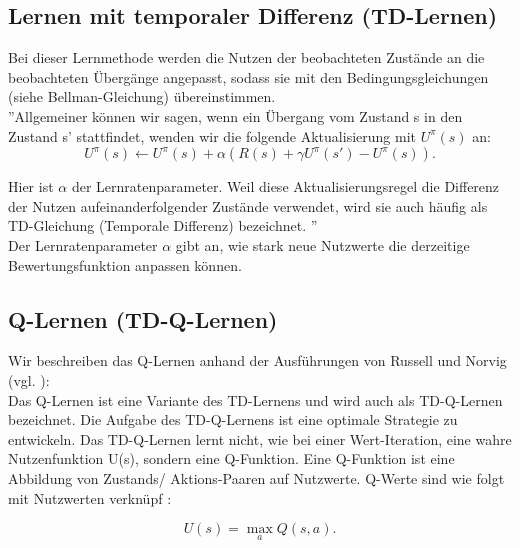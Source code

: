 \subsection{Lernen mit temporaler Differenz (TD-Lernen)}
\label{subsec:Lernen mit temporaler Differenz}
Bei dieser Lernmethode werden die Nutzen der beobachteten Zustände an die beobachteten Übergänge angepasst, sodass sie mit den Bedingungsgleichungen (siehe Bellman-Gleichung) übereinstimmen. \\

''Allgemeiner können wir sagen, wenn ein Übergang vom Zustand s in den Zustand s' stattfindet, wenden wir die folgende Aktualisierung mit $U^\pi(s)$ an:\\
\begin{equation}
\label{eq:Aktualisierungsgleichung temporale Differenz}
U^\pi(s) \leftarrow U^\pi(s) + \alpha(R(s) + \gamma U^\pi(s') - U^\pi(s)).
\end{equation}

Hier ist $\alpha$ der Lernratenparameter. Weil diese Aktualisierungsregel die Differenz der Nutzen aufeinanderfolgender Zustände verwendet, wird sie auch häufig als TD-Gleichung (Temporale Differenz) bezeichnet. \cite[966\psq]{Russell}'' \\ 

Der Lernratenparameter $\alpha$ gibt an, wie stark neue Nutzwerte die derzeitige Bewertungsfunktion anpassen können. 

\subsection{Q-Lernen (TD-Q-Lernen)}
\label{subsec:Q-Lernen}
Wir beschreiben das Q-Lernen anhand der Ausführungen von Russell und Norvig (vgl. \cite[973 \psq]{Russell}): \\

Das Q-Lernen ist eine Variante des TD-Lernens und wird auch als TD-Q-Lernen bezeichnet. Die Aufgabe des TD-Q-Lernens ist eine optimale Strategie zu entwickeln. Das TD-Q-Lernen lernt nicht, wie bei einer Wert-Iteration, eine wahre Nutzenfunktion U(s), sondern eine Q-Funktion. Eine Q-Funktion ist eine Abbildung von Zustands/ Aktions-Paaren auf Nutzwerte. Q-Werte sind wie folgt mit Nutzwerten verknüpf \cite[974]{Russell}:

\begin{equation}
\label{eq:Nutzenwerte und Q-Werte}
U(s) = \max_a Q(s,a).
\end{equation}

\newpage


